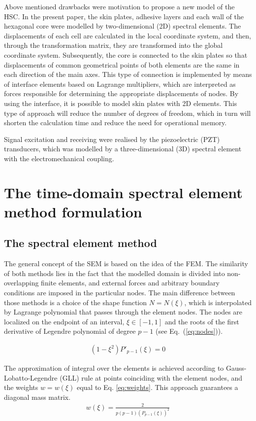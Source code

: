 \documentclass[a4paper,12pt]{article}
\begin{document}
{Above mentioned drawbacks were motivation to propose a new model of the HSC. 
In the present paper, the skin plates, adhesive layers and each wall of the hexagonal core were modelled by two-dimensional (2D) spectral elements.
The displacements of each cell are calculated in the local coordinate system, 
and then, through the transformation matrix, they are transformed into the 
global coordinate system.
Subsequently, the core is connected to the skin plates so that displacements of 
common geometrical points of both elements are the same in each direction of 
the main axes.
This type of connection is implemented by means of interface elements based on 
Lagrange multipliers, which are interpreted as forces responsible for 
determining the appropriate displacements of nodes.
By using the interface, it is possible to model skin plates with 2D elements.
This type of approach will reduce the number of degrees of freedom, which in 
turn will shorten the calculation time and reduce the need for operational 
memory.

Signal excitation and receiving were realised by the piezoelectric (PZT) transducers, which was modelled by a three-dimensional (3D) spectral element with the electromechanical coupling.
\section{The time-domain spectral element method formulation}
\label{sec:time_SEM}
\subsection{The spectral element method}
\label{sec:sem}
The general concept of the SEM is based on the idea of the FEM.
The similarity of both methods lies in the fact that the modelled domain is divided into non-overlapping finite elements, and external forces and arbitrary boundary conditions are imposed in the particular nodes.
The main difference between those methods is a choice of the shape function \( N=N(\xi )\), which is interpolated by Lagrange polynomial that passes through the element nodes. The nodes are localized on the endpoint of an interval, \(\xi\in[-1,1]\) and the roots of the first derivative of Legendre polynomial of degree \(p-1\) (see Eq.~(\ref{eq:nodes})).

\begin{eqnarray}
	(1-\xi^2)P'_{p-1}(\xi)=0
	\label{eq:nodes}
\end{eqnarray}

The approximation of integral over the elements is achieved according to Gauss-Lobatto-Legendre (GLL) rule at points coinciding with the element nodes, 
and the weights \(w=w(\xi)\) equal to Eq. \ref{eq:weights}. This approach guarantees a diagonal mass matrix.
\begin{eqnarray}
{w(\xi)} = \frac{2}{p(p-1)(P_{p-1}(\xi))^2}
\label{eq:weights}
\end{eqnarray}

}
\end{document}
